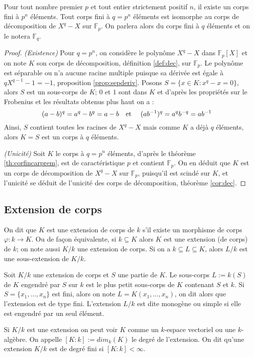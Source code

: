 \documentclass[a4paper]{article} %
\numberwithin{section}{part}
\numberwithin{equation}{section}
\newcommand\GF[1]{\mathbb{F}_{#1}}
\newcommand\etmath{\textup{\quad et \quad}}
\begin{document}
\begin{thm}
\label{th:isomGF}
Pour tout nombre premier $p$ et tout entier strictement positif $n$, il existe 
un corps fini à $p^n$ éléments. Tout corps fini à $q = p^n$ éléments est 
isomorphe au corps de décomposition de $X^q - X$ sur $\GF{p}$. On parlera alors 
du corps fini à $q$ éléments et on le notera $\GF{q}$.
\end{thm}
\begin{proof}
\textit{(Existence)} Pour $q = p^n$, on considère le polynôme $X^q - X$ dans 
$\GF{p}[X]$ et on note $K$ son corps de décomposition, définition \ref{def:dec},
sur $\GF{p}$. Le polynôme est séparable ou n'a aucune racine multiple puisque sa
dérivée est égale à $qX^{q-1} - 1 = -1$, proposition \ref{prop:sepderiv}. Posons
$S=\lbrace x\in K : x^q - x = 0\rbrace$, alors $S$ est un sous-corps de $K$; $0$
et $1$ sont dans $K$ et d'après les propriétés sur le Frobenius et les résultats
obtenus plus haut on a :
\[(a - b)^q = a^q - b^q = a - b \etmath(ab^{-1})^q = a^qb^{-q} = ab^{-1}\]
Ainsi, $S$ contient toutes les racines de $X^q - X$ mais comme $K$ a déjà $q$
éléments, alors $K = S$ est un corps à $q$ éléments.\par
\textit{(Unicité)} Soit $K$ le corps à $q = p^n$ éléments, d'après le théorème
\ref{th:corfincarprem}, est de caractéristique $p$ et contient $\GF{p}$. On en
déduit que $K$ est un corps de décomposition de $X^q - X$ sur $\GF{p}$,
puisqu'il est scindé sur $K$, et l'unicité se déduit de l'unicité des corps de
décomposition, théorème \ref{cor:dec}.
\end{proof}

\subsection{Extension de corps}
\label{def:degext}
On dit que $K$ est une extension de corps de $k$ s'il existe un morphisme de 
corps $\varphi : k \to K$. Ou de façon équivalente, si $k \subseteq K$ alors $K$
est une extension (de corps) de $k$; on note aussi $K/k$ une extension de corps.
Si on a $k\subseteq L \subseteq K$, alors $L/k$ est une sous-extension de
$K/k$.\par
Soit $K/k$ une extension de corps et $S$ une partie de $K$. Le sous-corps $L := 
k(S)$ de $K$ engendré par $S$ sur $k$ est le plus petit sous-corps de $K$ 
contenant $S$ et $k$. Si $S = \lbrace x_1,\dots,x_n \rbrace$ est fini, alors on 
note $L = K(x_1,\dots,x_n)$, on dit alors que l'extension est de type fini. 
L'extension $L/k$ est dite monogène ou simple si elle est engendré par un seul 
élément.\par
Si $K/k$ est une extension on peut voir $K$ comme un $k$-espace vectoriel ou une
$k$-algèbre. On appelle $[K:k] := dim_k(K)$ le degré de l'extension. On dit 
qu'une extension $K/k$ est de degré fini si $[K:k] < \infty$.\par
\end{document}
